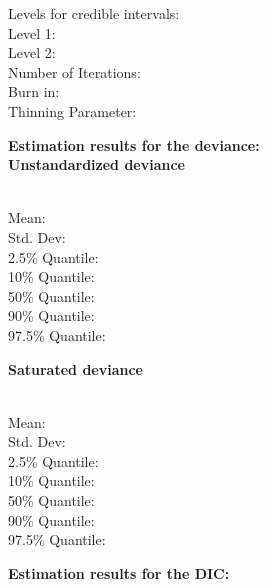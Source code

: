 \documentclass[a4paper, 12pt]{article}
\begin{document}
\begin{tabbing}
Levels for credible intervals: \= \\
Level 1: \\
Level 2: \\
Number of Iterations: \\
Burn in: \\
Thinning Parameter: 
\end{tabbing}
\vspace{0.5cm}

 {\bf \large Estimation results for the deviance: }\\ 

{\bf Unstandardized deviance } 

\vspace{-0.4cm}
\begin{tabbing}
\hspace{3cm} \= \\
  Mean:            \\
  Std. Dev:        \\
  2.5\% Quantile:   \\
  10\% Quantile:   \\
  50\% Quantile:   \\
  90\% Quantile:   \\
  97.5\% Quantile:   \\
\end{tabbing}

{\bf Saturated deviance } 

\vspace{-0.4cm}
\begin{tabbing}
\hspace{3cm} \= \\
  Mean:            \\
  Std. Dev:        \\
  2.5\% Quantile:   \\
  10\% Quantile:   \\
  50\% Quantile:   \\
  90\% Quantile:   \\
  97.5\% Quantile:   \\
\end{tabbing}


 {\bf \large Estimation results for the DIC: }\\ 
\end{document}
